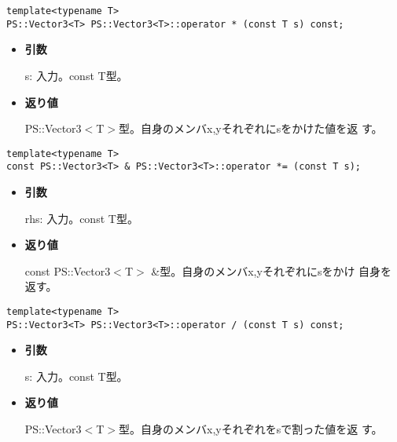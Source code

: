 \mbox{}

\begin{screen}
\begin{verbatim}
template<typename T>
PS::Vector3<T> PS::Vector3<T>::operator * (const T s) const;
\end{verbatim}
\end{screen}

\begin{itemize}

\item{{\bf 引数}}

{s}: 入力。{const T}型。

\item{{\bf 返り値}}

{PS::Vector3$<$T$>$}型。自身のメンバx,yそれぞれに{s}をかけた値を返
す。

\end{itemize}


\begin{screen}
\begin{verbatim}
template<typename T>
const PS::Vector3<T> & PS::Vector3<T>::operator *= (const T s);
\end{verbatim}
\end{screen}

\begin{itemize}

\item{{\bf 引数}}

{rhs}: 入力。{const T}型。

\item{{\bf 返り値}}

{const PS::Vector3$<$T$>$ \&}型。自身のメンバx,yそれぞれに{s}をかけ
自身を返す。

\end{itemize}


\begin{screen}
\begin{verbatim}
template<typename T>
PS::Vector3<T> PS::Vector3<T>::operator / (const T s) const;
\end{verbatim}
\end{screen}

\begin{itemize}

\item{{\bf 引数}}

{s}: 入力。{const T}型。

\item{{\bf 返り値}}

{PS::Vector3$<$T$>$}型。自身のメンバx,yそれぞれを{s}で割った値を返
す。

\end{itemize}


